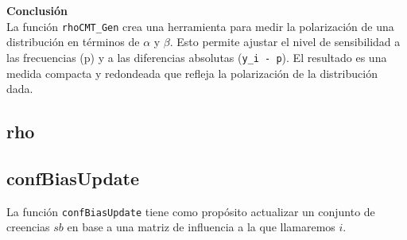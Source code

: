 \documentclass{article}
\begin{document}
	\textbf{Conclusión}\\

	La función \texttt{rhoCMT\_Gen} crea una herramienta para medir la polarización de una distribución en términos de $\alpha$ y $\beta$. Esto permite ajustar el nivel de sensibilidad a las frecuencias (p) y a las diferencias absolutas (\texttt{y\_i - p}). El resultado es una medida compacta y redondeada que refleja la polarización de la distribución dada.


    \subsection{rho}

\subsection{confBiasUpdate}
	
	La función \texttt{confBiasUpdate} tiene como propósito actualizar un conjunto de creencias $sb$ en base a una matriz de influencia a la que llamaremos $i$.
  \\
\end{document}
